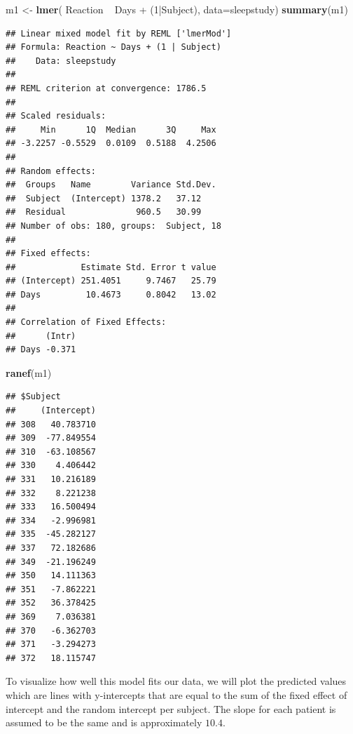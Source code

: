 \documentclass[]{book}
\newenvironment{Shaded}{\begin{snugshade}}{\end{snugshade}}
\newcommand{\KeywordTok}[1]{\textcolor[rgb]{0.13,0.29,0.53}{\textbf{{#1}}}}
\newcommand{\DataTypeTok}[1]{\textcolor[rgb]{0.13,0.29,0.53}{{#1}}}
\newcommand{\DecValTok}[1]{\textcolor[rgb]{0.00,0.00,0.81}{{#1}}}
\newcommand{\StringTok}[1]{\textcolor[rgb]{0.31,0.60,0.02}{{#1}}}
\newcommand{\NormalTok}[1]{{#1}}
\theoremstyle{definition}
\theoremstyle{definition}
\theoremstyle{remark}
\begin{document}
\begin{Shaded}
\begin{Highlighting}[]
\NormalTok{m1 <-}\StringTok{ }\KeywordTok{lmer}\NormalTok{( Reaction ~}\StringTok{ }\NormalTok{Days +}\StringTok{ }\NormalTok{(}\DecValTok{1}\NormalTok{|Subject), }\DataTypeTok{data=}\NormalTok{sleepstudy)}
\KeywordTok{summary}\NormalTok{(m1)}
\end{Highlighting}
\end{Shaded}

\begin{verbatim}
## Linear mixed model fit by REML ['lmerMod']
## Formula: Reaction ~ Days + (1 | Subject)
##    Data: sleepstudy
## 
## REML criterion at convergence: 1786.5
## 
## Scaled residuals: 
##     Min      1Q  Median      3Q     Max 
## -3.2257 -0.5529  0.0109  0.5188  4.2506 
## 
## Random effects:
##  Groups   Name        Variance Std.Dev.
##  Subject  (Intercept) 1378.2   37.12   
##  Residual              960.5   30.99   
## Number of obs: 180, groups:  Subject, 18
## 
## Fixed effects:
##             Estimate Std. Error t value
## (Intercept) 251.4051     9.7467   25.79
## Days         10.4673     0.8042   13.02
## 
## Correlation of Fixed Effects:
##      (Intr)
## Days -0.371
\end{verbatim}

\begin{Shaded}
\begin{Highlighting}[]
\KeywordTok{ranef}\NormalTok{(m1)}
\end{Highlighting}
\end{Shaded}

\begin{verbatim}
## $Subject
##     (Intercept)
## 308   40.783710
## 309  -77.849554
## 310  -63.108567
## 330    4.406442
## 331   10.216189
## 332    8.221238
## 333   16.500494
## 334   -2.996981
## 335  -45.282127
## 337   72.182686
## 349  -21.196249
## 350   14.111363
## 351   -7.862221
## 352   36.378425
## 369    7.036381
## 370   -6.362703
## 371   -3.294273
## 372   18.115747
\end{verbatim}

To visualize how well this model fits our data, we will plot the
predicted values which are lines with y-intercepts that are equal to the
sum of the fixed effect of intercept and the random intercept per
subject. The slope for each patient is assumed to be the same and is
approximately \(10.4\).
\end{document}
